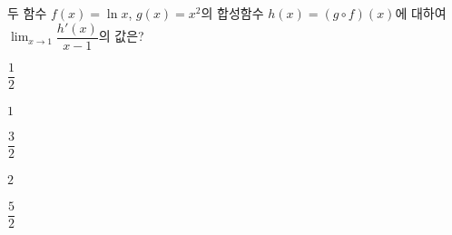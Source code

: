 두 함수 $f(x)=\ln x$, $g(x)=x^2$의 합성함수 $h(x)=(g\circ f)(x)$에 대하여 $\displaystyle\lim_{x\to 1}\dfrac{h'(x)}{x-1}$의 값은?
\begin{choices32}{\rule[-3ex]{0pt}{8ex}$\dfrac{1}{2}$}{\rule[-3ex]{0pt}{8ex}$1$}{\rule[-3ex]{0pt}{8ex}$\dfrac{3}{2}$}{\rule[-3ex]{0pt}{8ex}$2$}{\rule[-3ex]{0pt}{8ex}$\dfrac{5}{2}$}\end{choices32}
